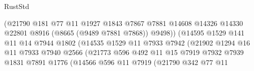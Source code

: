 \begin{lexlean}{RustStd}
\begin{coremodule}
                                        (@21790
                                          @181
                                          @77
                                          @11
                                          @1927
                                          @1843
                                          @7867
                                          @7881
                                          @14608
                                          @14326
                                          @14330
                                          @22801
                                          @8916
                                          (@8665 (@9489 @7881 @7868))
                                          @9498))
                                      (@14595
                                        @1529
                                        @141
                                        @11
                                        @14
                                        @7944
                                        @1802
                                        (@14535
                                          @1529
                                          @11
                                          @7933
                                          @7942
                                          (@21902
                                            @1294
                                            @16
                                            @11
                                            @7933
                                            @7940
                                            @2566
                                            (@21773
                                              @596
                                              @492
                                              @11
                                              @15
                                              @7919
                                              @7932
                                              @7939
                                              @1831
                                              @7891
                                              @1776
                                              (@14566
                                                @596
                                                @11
                                                @7919
                                                (@21790
                                                  @342
                                                  @77
                                                  @11

\end{coremodule}
\end{lexlean}
